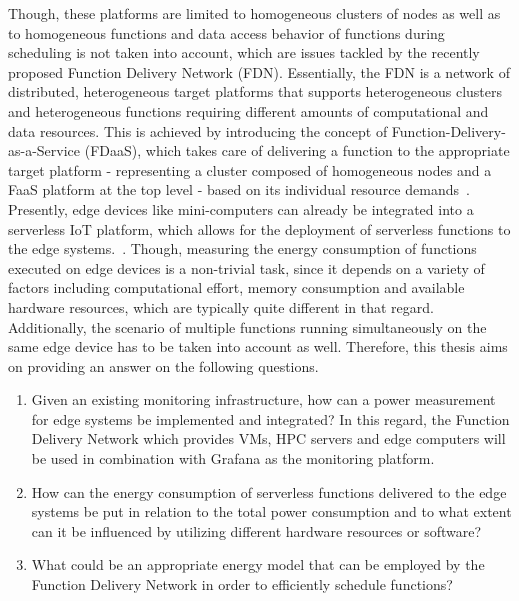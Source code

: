 Though, these platforms are limited to homogeneous clusters of nodes as well as to homogeneous functions and data access behavior of functions during scheduling is not taken into account, which are issues tackled by the recently proposed Function Delivery Network (FDN). Essentially, the FDN is a network of distributed, heterogeneous target platforms that supports heterogeneous clusters and heterogeneous functions requiring different amounts of computational and data resources. This is achieved by introducing the concept of Function-Delivery-as-a-Service (FDaaS), which takes care of delivering a function to the appropriate target platform - representing a cluster composed of homogeneous nodes and a FaaS platform at the top level - based on its individual resource demands~\parencite{fdn}. \\
Presently, edge devices like mini-computers can already be integrated into a serverless IoT platform, which allows for the deployment of serverless functions to the edge systems.~\parencite{fdn}. Though, measuring the energy consumption of functions executed on edge devices is a non-trivial task, since it depends on a variety of factors including computational effort, memory consumption and available hardware resources, which are typically quite different in that regard. Additionally, the scenario of multiple functions running simultaneously on the same edge device has to be taken into account as well. Therefore, this thesis aims on providing an answer on the following questions.

\begin{enumerate}
  \item Given an existing monitoring infrastructure, how can a power measurement for edge systems be implemented and integrated? In this regard, the Function Delivery Network which provides VMs, HPC servers and edge computers will be used in combination with Grafana as the monitoring platform.
  \item How can the energy consumption of serverless functions delivered to the edge systems be put in relation to the total power consumption and to what extent can it be influenced by utilizing different hardware resources or software?
  \item What could be an appropriate energy model that can be employed by the Function Delivery Network in order to efficiently schedule functions?
\end{enumerate}

